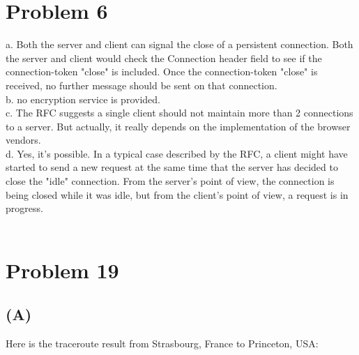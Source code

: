 \documentclass[titlepage, paper=a4, fontsize=11pt]{scrartcl} %
\numberwithin{equation}{section} %
\numberwithin{figure}{section} %
\numberwithin{table}{section} %
\begin{document}

\section*{Problem 6}
a. Both the server and client can signal the close of a persistent connection. Both the server and client
would check the Connection header field to see if the connection-token "close" is included. Once the
connection-token "close" is received, no further message should be sent on that connection. \\
b. no encryption service is provided. \\
c. The RFC suggests a single client should not maintain more than 2 connections to a server. But actually,
it really depends on the implementation of the browser vendors. \\
d. Yes, it's possible. In a typical case described by the RFC, a client might have started to send a new request
at the same time that the server has decided to close the "idle" connection. From the server's point of view,
the connection is being closed while it was idle, but from the client's point of view, a request is in progress.\\
\\



\section*{Problem 19}
\subsection*{(A)}
Here is the traceroute result from Strasbourg, France to Princeton, USA: \\
\end{document}

